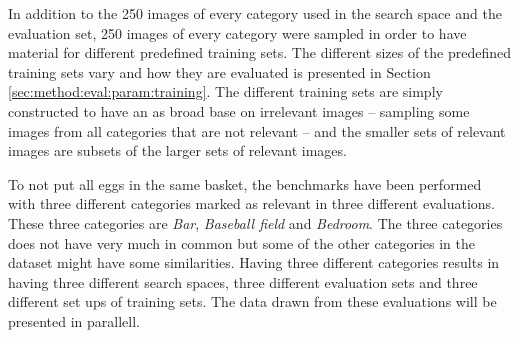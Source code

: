 In addition to the 250 images of every category used in the search space and the evaluation set, 250 images of every category were sampled in order to have material for different predefined training sets. The different sizes of the predefined training sets vary and how they are evaluated is presented in Section \ref{sec:method:eval:param:training}. The different training sets are simply constructed to have an as broad base on irrelevant images -- sampling some images from all categories that are not relevant -- and the smaller sets of relevant images are subsets of the larger sets of relevant images.  

To not put all eggs in the same basket, the benchmarks have been performed with three different categories marked as relevant in three different evaluations. These three categories are \emph{Bar}, \emph{Baseball field} and \emph{Bedroom}. The three categories does not have very much in common but some of the other categories in the dataset might have some similarities. Having three different categories results in having three different search spaces, three different evaluation sets and three different set ups of training sets. The data drawn from these evaluations will be presented in parallell. 

